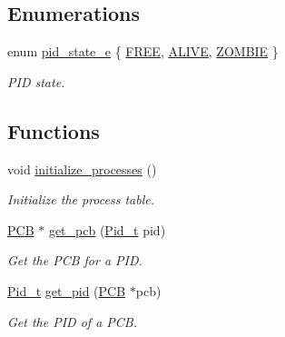 \subsection*{Enumerations}
\begin{DoxyCompactItemize}
\item 
enum \hyperlink{group__proc_ga4f133ac5f9b2ca9c1446889baee1dc05}{pid\-\_\-state\-\_\-e} \{ \hyperlink{group__proc_gga4f133ac5f9b2ca9c1446889baee1dc05acc62d1576546f3245237e1b232d838b6}{F\-R\-E\-E}, 
\hyperlink{group__proc_gga4f133ac5f9b2ca9c1446889baee1dc05a4f34c5c191d6e0d028ca831b6c0b1571}{A\-L\-I\-V\-E}, 
\hyperlink{group__proc_gga4f133ac5f9b2ca9c1446889baee1dc05a5dfb36109b24f39d54d5c3f48f53def8}{Z\-O\-M\-B\-I\-E}
 \}
\begin{DoxyCompactList}\small\item\em P\-I\-D state. \end{DoxyCompactList}\end{DoxyCompactItemize}
\subsection*{Functions}
\begin{DoxyCompactItemize}
\item 
void \hyperlink{group__proc_ga82948cbeb57bb0b6e15d1f14f06a2db3}{initialize\-\_\-processes} ()
\begin{DoxyCompactList}\small\item\em Initialize the process table. \end{DoxyCompactList}\item 
\hyperlink{group__proc_gadf327f09ee935cf1734c14e8849f0421}{P\-C\-B} $\ast$ \hyperlink{group__proc_ga10cf45ea8bc92b00bd1f25553b9cf5c8}{get\-\_\-pcb} (\hyperlink{group__syscalls_gafac07f3170763932fac97b6eab2c3984}{Pid\-\_\-t} pid)
\begin{DoxyCompactList}\small\item\em Get the P\-C\-B for a P\-I\-D. \end{DoxyCompactList}\item 
\hyperlink{group__syscalls_gafac07f3170763932fac97b6eab2c3984}{Pid\-\_\-t} \hyperlink{group__proc_ga110e884cb053244b18d1058751a78cfe}{get\-\_\-pid} (\hyperlink{group__proc_gadf327f09ee935cf1734c14e8849f0421}{P\-C\-B} $\ast$pcb)
\begin{DoxyCompactList}\small\item\em Get the P\-I\-D of a P\-C\-B. \end{DoxyCompactList}\end{DoxyCompactItemize}


